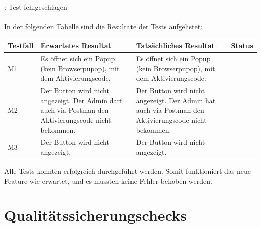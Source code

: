 \textcolor{red}{}   : Test fehlgeschlagen\\
\\
In der folgenden Tabelle sind die Resultate der Tests aufgelistet: \newpage
\begin{longtable}{|p{}|p{}|p{}|p{}|}
	\hline
	\textbf{Testfall} & \textbf{Erwartetes Resultat} & \textbf{Tatsächliches Resultat} &\textbf{Status} \\ \hline
	M1 & Es öffnet sich ein Popup (kein Browserpupop), mit dem Aktivierungscode.  & Es öffnet sich ein Popup (kein Browserpupop), mit dem Aktivierungscode. &  \textcolor{green}{\checkmark} \\ \hline 
	M2 & Der Button wird nicht angezeigt. Der Admin darf auch via Postman den Aktivierungscode nicht bekommen.  &  Der Button wird nicht angezeigt. Der Admin hat auch via Postman den Aktivierungscode nicht bekommen. & \textcolor{green}{\checkmark} \\ \hline 
	M3 & Der Button wird nicht angezeigt.  &  Der Button wird nicht angezeigt.   & \textcolor{green}{\checkmark} \\ \hline 
\end{longtable}
\noindent Alle Tests konnten erfolgreich durchgeführt werden. Somit funktioniert das neue Feature wie erwartet, und es mussten keine Fehler behoben werden.

\section{Qualitätssicherungschecks}
